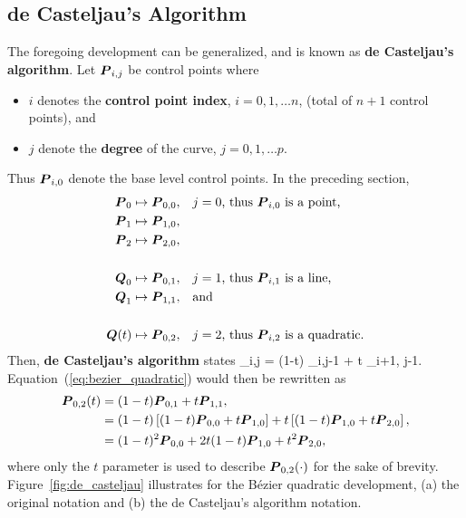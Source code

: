 \subsection{de Casteljau's Algorithm}
\label{sec:de_casteljau}
The foregoing development can be generalized, and is known as 
{\bf de Casteljau's algorithm}.  Let $\mbox{\boldmath $P$}_{i,j}$ be control points
where 
\begin{itemize}
\item $i$ denotes the {\bf control point index}, $i=0, 1, \ldots n$, (total 
of $n+1$ control points), and
\item $j$ denote the {\bf degree} of the curve, $j=0, 1, \ldots p$.
\end{itemize}
Thus $\mbox{\boldmath $P$}_{i,0}$ denote the base level control points. 
In the preceding section, 
\begin{align}
\mbox{\boldmath $P$}_0 & \mapsto \mbox{\boldmath $P$}_{0,0}, \;\;\;\mbox{$j=0$, thus $\mbox{\boldmath $P$}_{i,0}$ is a point,}\\
\mbox{\boldmath $P$}_1 & \mapsto \mbox{\boldmath $P$}_{1,0}, \\
\mbox{\boldmath $P$}_2 & \mapsto \mbox{\boldmath $P$}_{2,0}, \\
 & \nonumber \\
\mbox{\boldmath $Q$}_0 & \mapsto \mbox{\boldmath $P$}_{0,1}, \;\;\;\mbox{$j=1$, thus $\mbox{\boldmath $P$}_{i,1}$ is a line,}\\
\mbox{\boldmath $Q$}_1 & \mapsto \mbox{\boldmath $P$}_{1,1}, \;\;\;\mbox{and} \\
 & \nonumber \\
\mbox{\boldmath $Q$}(t) & \mapsto \mbox{\boldmath $P$}_{0,2}, \;\;\;\mbox{$j=2$, thus $\mbox{\boldmath $P$}_{i,2}$ is a quadratic.}
\end{align}
Then, {\bf de Casteljau's algorithm} states
\be
\vP_{i,j} = (1-t) \vP_{i,j-1} + t \vP_{i+1, j-1}.
\ee
Equation~(\ref{eq:bezier_quadratic}) would then be rewritten as
\begin{align}
\mbox{\boldmath $P$}_{0,2}(t)
& = (1-t) \mbox{\boldmath $P$}_{0,1} + t \mbox{\boldmath $P$}_{1,1}, \\
& = (1-t) \left[ (1-t) \mbox{\boldmath $P$}_{0,0} + t \mbox{\boldmath $P$}_{1,0} \right] + 
    t     \left[ (1-t) \mbox{\boldmath $P$}_{1,0} + t \mbox{\boldmath $P$}_{2,0} \right], \\
& = (1-t)^2 \mbox{\boldmath $P$}_{0,0} + 
2t (1-t) \mbox{\boldmath $P$}_{1,0} + t^2 \mbox{\boldmath $P$}_{2,0},
\label{eq:quadratic_bezier}
\end{align}
where only the $t$ parameter is used to describe $\mbox{\boldmath $P$}_{0,2}(\cdot)$ for the 
sake of brevity.  Figure~\ref{fig:de_casteljau} illustrates for the B\'ezier
quadratic development, (a) the original notation and (b) the de 
Casteljau's algorithm notation.

